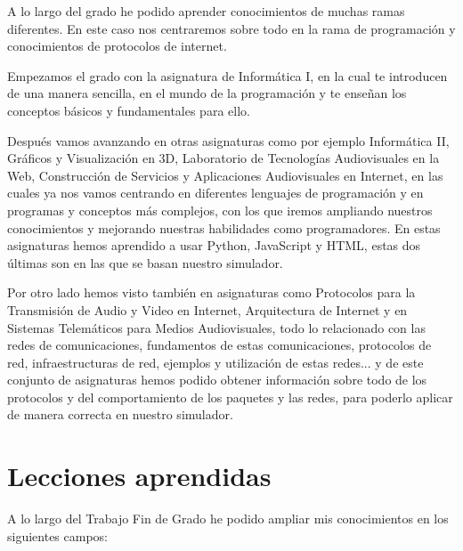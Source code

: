 \documentclass[a4paper, 12pt]{book}
\begin{document}
A lo largo del grado he podido aprender conocimientos de muchas ramas diferentes. En este caso nos centraremos sobre todo en la rama de programación y conocimientos de protocolos de internet.

Empezamos el grado con la asignatura de Informática I, en la cual te introducen de una manera sencilla, en el mundo de la programación y te enseñan los conceptos básicos y fundamentales para ello.

Después vamos avanzando en otras asignaturas como por ejemplo Informática II, Gráficos y Visualización en 3D, Laboratorio de Tecnologías Audiovisuales en la Web, Construcción de Servicios y Aplicaciones Audiovisuales en Internet, en las cuales ya nos vamos centrando en diferentes lenguajes de programación y en programas y conceptos más complejos, con los que iremos ampliando nuestros conocimientos y mejorando nuestras habilidades como programadores. En estas asignaturas hemos aprendido a usar Python, JavaScript y HTML, estas dos últimas son en las que se basan nuestro simulador.

Por otro lado hemos visto también en asignaturas como Protocolos para la Transmisión de Audio y Video en Internet, Arquitectura de Internet y en Sistemas Telemáticos para Medios Audiovisuales, todo lo relacionado con las redes de comunicaciones, fundamentos de estas comunicaciones, protocolos de red, infraestructuras de red, ejemplos y utilización de estas redes... y de este conjunto de asignaturas hemos podido obtener información sobre todo de los protocolos y del comportamiento de los paquetes y las redes, para poderlo aplicar de manera correcta en nuestro simulador.


\section{Lecciones aprendidas}
\label{sec:lecciones_aprendidas}

A lo largo del Trabajo Fin de Grado he podido ampliar mis conocimientos en los siguientes campos:
\end{document}
